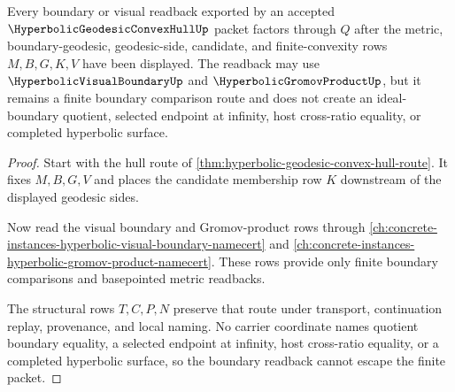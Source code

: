 \begin{theorem}
\label{thm:hyperbolic-geodesic-convex-hull-boundary-readback}
Every boundary or visual readback exported by an accepted $\HyperbolicGeodesicConvexHullUp$ packet factors through $Q$ after the metric, boundary-geodesic, geodesic-side, candidate, and finite-convexity rows $M,B,G,K,V$ have been displayed. The readback may use $\HyperbolicVisualBoundaryUp$ and $\HyperbolicGromovProductUp$, but it remains a finite boundary comparison route and does not create an ideal-boundary quotient, selected endpoint at infinity, host cross-ratio equality, or completed hyperbolic surface.
\end{theorem}
\begin{proof}
Start with the hull route of \autoref{thm:hyperbolic-geodesic-convex-hull-route}. It fixes $M,B,G,V$ and places the candidate membership row $K$ downstream of the displayed geodesic sides.

Now read the visual boundary and Gromov-product rows through \autoref{ch:concrete-instances-hyperbolic-visual-boundary-namecert} and \autoref{ch:concrete-instances-hyperbolic-gromov-product-namecert}. These rows provide only finite boundary comparisons and basepointed metric readbacks.

The structural rows $T,C,P,N$ preserve that route under transport, continuation replay, provenance, and local naming. No carrier coordinate names quotient boundary equality, a selected endpoint at infinity, host cross-ratio equality, or a completed hyperbolic surface, so the boundary readback cannot escape the finite packet.
\end{proof}

